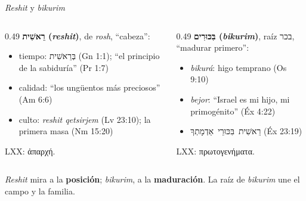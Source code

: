 \documentclass[hyperref={bookmarks=false},aspectratio=169]{beamer}
\newcommand{\heb}[1]{\mbox{\foreignlanguage{hebrew}{#1}}}
\newcommand{\grc}[1]{\foreignlanguage{ancientgreek}{#1}}
\newcommand{\destacar}[1]{\textbf{\textcolor{tierraroja}{#1}}}
\begin{document}
\begin{frame}{\emph{Reshit} y \emph{bikurim}}
\begin{columns}[t,onlytextwidth]
\begin{column}{0.49\textwidth}\small\RaggedRight
\textbf{\color{tierraroja}\heb{רֵאשִׁית} (\emph{reshit})}, de \emph{rosh}, ``cabeza'':
\begin{itemize}
\item tiempo: \heb{בְּרֵאשִׁית} (Gn 1:1); ``el principio de la sabiduría'' (Pr 1:7)
\item calidad: ``los ungüentos más preciosos'' (Am 6:6)
\item culto: \emph{reshit qetsirjem} (Lv 23:10); la primera masa (Nm 15:20)
\end{itemize}
\scriptsize LXX: \grc{ἀπαρχή}.
\end{column}
\begin{column}{0.49\textwidth}\small\RaggedRight
\textbf{\color{tierraroja}\heb{בִּכּוּרִים} (\emph{bikurim})}, raíz \heb{בכר}, ``madurar primero'':
\begin{itemize}
\item \emph{bikurá}: higo temprano (Os 9:10)
\item \emph{bejor}: ``Israel es mi hijo, mi primogénito'' (Éx 4:22)
\item \heb{רֵאשִׁית בִּכּוּרֵי אַדְמָתְךָ} (Éx 23:19)
\end{itemize}
\scriptsize LXX: \grc{πρωτογενήματα}.
\end{column}
\end{columns}\medskip
\small\RaggedRight \emph{Reshit} mira a la \destacar{posición}; \emph{bikurim}, a la \destacar{maduración}. La raíz de \emph{bikurim} une el campo y la familia.
\end{frame}
\end{document}
